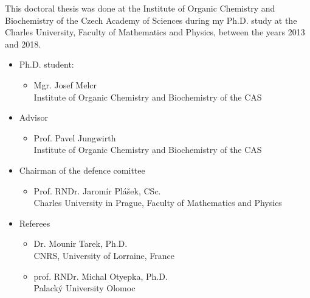 \documentclass[12pt,a4paper,twoside,openright]{report}
\begin{document}
\newlength{\figwidth}
\setlength{\figwidth}{9 cm} 
\newlength{\figwidthsmall}
\setlength{\figwidthsmall}{6 cm} 
\newlength{\figwidthsmalltriple}
\setlength{\figwidthsmalltriple}{4.55 cm} 
\newlength{\figwidthfull}
\setlength{\figwidthfull}{14 cm} 





This doctoral thesis was done at the Institute of Organic Chemistry and
Biochemistry of the Czech Academy of Sciences during my Ph.D. study at
the Charles University, Faculty of Mathematics and Physics, 
between the years 2013 and 2018.

\begin{itemize}
\item Ph.D. student:
	\begin{itemize}
	\item[~] Mgr. Josef Melcr \\
	Institute of Organic Chemistry and Biochemistry of the CAS \\
	\end{itemize}

\item Advisor
	\begin{itemize}
	\item[~] Prof. Pavel Jungwirth \\
	Institute of Organic Chemistry and Biochemistry of the CAS \\
	\end{itemize}

\item Chairman of the defence comittee
	\begin{itemize}
	\item[~] Prof. RNDr. Jaromír Plášek, CSc. \\
	Charles University in Prague, Faculty of Mathematics and Physics \\
	\end{itemize}

\item Referees
	\begin{itemize}
	\item[~] Dr. Mounir Tarek, Ph.D. \\
	CNRS, University of Lorraine, France \\
	\item[~] prof. RNDr. Michal Otyepka, Ph.D.  \\
	Palack\'{y} University Olomoc \\
	\end{itemize}
\end{itemize}
\end{document}
